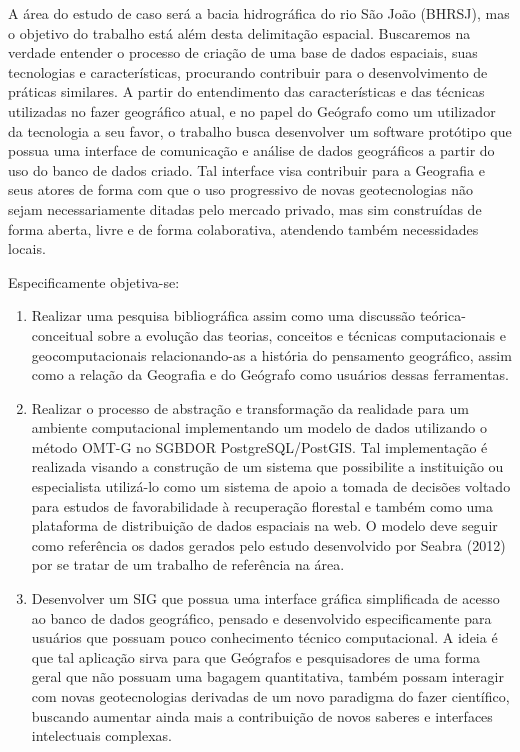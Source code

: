 A área do estudo de caso será a bacia hidrográfica do rio São João (BHRSJ), mas o objetivo do trabalho está além desta delimitação espacial. Buscaremos na verdade entender o processo de criação de uma base de dados espaciais, suas tecnologias e características, procurando contribuir para o desenvolvimento de práticas similares. A partir do entendimento das características e das técnicas utilizadas no fazer geográfico atual, e no papel do Geógrafo como um utilizador da tecnologia a seu favor, o trabalho busca desenvolver um software protótipo que possua uma interface de comunicação e análise de dados geográficos a partir do uso do banco de dados criado. Tal interface visa contribuir para a Geografia e seus atores de forma com que o uso progressivo de novas geotecnologias não sejam necessariamente ditadas pelo mercado privado, mas sim construídas de forma aberta, livre e de forma colaborativa, atendendo também necessidades locais. \par
Especificamente objetiva-se: \par
\begin{enumerate}
	\item Realizar uma pesquisa bibliográfica assim como uma discussão teórica-conceitual sobre a evolução das teorias, conceitos e técnicas computacionais e geocomputacionais relacionando-as a história do pensamento geográfico, assim como a relação da Geografia e do Geógrafo como usuários dessas ferramentas.
	\item Realizar o processo de abstração e transformação da realidade para um ambiente computacional implementando um modelo de dados utilizando o método OMT-G no SGBDOR PostgreSQL/PostGIS. Tal implementação é realizada visando a construção de um sistema que  possibilite a instituição ou especialista utilizá-lo como um sistema de apoio a tomada de decisões voltado para estudos de favorabilidade à recuperação florestal e também como uma plataforma de distribuição de dados espaciais na web. O modelo deve seguir como referência os dados gerados pelo estudo desenvolvido por Seabra (2012) por se tratar de um trabalho de referência na área.
	\item Desenvolver um SIG que possua uma interface gráfica simplificada de acesso ao banco de dados geográfico, pensado e desenvolvido especificamente para usuários que possuam pouco conhecimento técnico computacional. A ideia é que tal aplicação sirva para que Geógrafos e pesquisadores de uma forma geral que não possuam uma bagagem quantitativa, também possam interagir com novas geotecnologias derivadas de um novo paradigma do fazer científico, buscando aumentar ainda mais a contribuição de novos saberes e interfaces intelectuais complexas.
\end{enumerate}